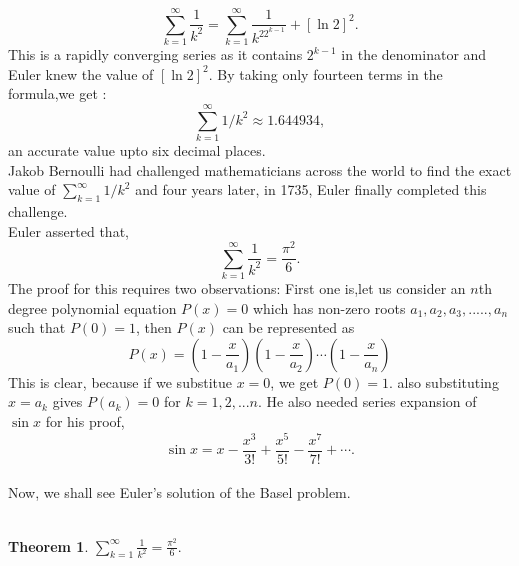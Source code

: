 \documentclass[a4paper,reqno,11pt]{amsart}
\theoremstyle{plain}%
\newtheorem{thm}{Theorem}[section]
\begin{document}
$$\sum_{k=1}^{\infty}\frac{1}{k^2} = \sum_{k=1}^{\infty}\frac{1}{k^22^{k-1}}  + [\ln2]^2.$$
This is a rapidly converging series as it contains $2^{k-1}$ in the denominator and Euler knew the value of $[\ln2]^2$. By taking only fourteen terms in the formula,we get : $$\sum_{k=1}^{\infty}1/k^2 \approx 1.644934,$$ an accurate value upto six decimal places.\\
Jakob Bernoulli had challenged mathematicians across the world to find the 
exact value of $\sum_{k=1}^{\infty}1/k^2$ and four years later, in 1735, Euler finally completed this challenge.\\
\indent Euler asserted that,\\
$$\sum_{k=1}^{\infty}\frac{1}{k^2} = \frac{\pi^2}{6}.$$
The proof for this requires two observations: First one is,let us consider an $n$th degree polynomial equation $P(x) = 0$ which has non-zero roots $a_{1},a_{2},a_{3},.....,a_{n}$ such that $P(0) = 1$, then $P(x)$ can be represented as
$$P(x) = \left(1-\frac{x}{a_{1}}\right)\left(1-\frac{x}{a_{2}}\right)\cdots\left(1-\frac{x}{a_{n}}\right)$$
This is clear, because if we substitue $x = 0$, we get $P(0) = 1.$ also substituting $x = a_{k}$ gives $P(a_{k}) = 0$ for $k = 1, 2, ... n.$ He also needed series expansion of $\sin x$ for his proof,
$$\sin x = x - \frac{x^3}{3!} + \frac{x^5}{5!} - \frac{x^7}{7!} + \cdots.$$
\\
Now, we shall see Euler's solution of the Basel problem.\\
\\
\begin{thm}\label{thm:Type 1} $\sum_{k=1}^{\infty}\frac{1}{k^2} = \frac{\pi^2}{6}.$\\
\end{thm}
\end{document}
